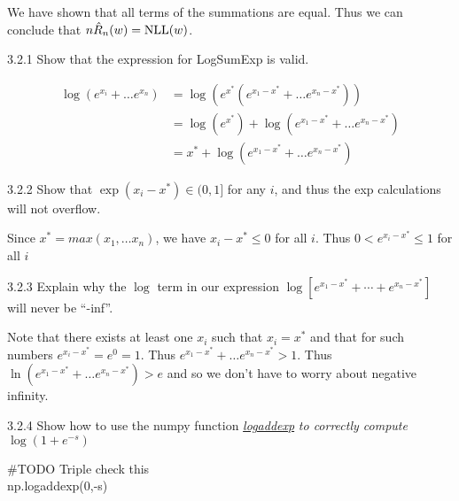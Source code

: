\documentclass[12pt,letterpaper]{article}
\begin{document}
\begin{solution}{}
    We have shown that all terms of the summations are equal. Thus we can conclude that $n\hat{R}_{n}(w)=\text{NLL}(w)$.
\end{solution}
\newpage

\begin{problem}{3.2.1}
    Show that the expression for LogSumExp is valid.
\end{problem}
\begin{solution}{}
    \begin{align*}
        \log(e^{x_i} + \dots e^{x_n}) &= \log(e^{x^*}(e^{x_1-x^*} + \dots e^{x_n-x^*}))\\
        &= \log(e^{x^*}) + \log(e^{x_1-x^*} + \dots e^{x_n-x^*})\\
        &= x^* + \log(e^{x_1-x^*} + \dots e^{x_n-x^*})
    \end{align*}
\end{solution}
\newpage

\begin{problem}{3.2.2}
    Show that $\exp\left(x_{i}-x^{*}\right)\in(0,1]$ for any $i$, and thus the exp calculations will not overflow.
\end{problem}
\begin{solution}{}
    Since $x^*=max(x_1, \dots x_n)$, we have $x_i-x^*\leq 0$ for all $i$. Thus $0<e^{x_i-x^*}\leq1$ for all $i$
\end{solution}
\newpage

\begin{problem}{3.2.3}
    Explain why the $\log$ term in our expression
    $\log\left[e^{x_{1}-x^{*}}+\cdots+e^{x_{n}-x^{*}}\right]$ will never
    be ``-inf''.
\end{problem}
\begin{solution}{}
    Note that there exists at least one $x_i$ such that $x_i=x^*$ and that for such numbers $e^{x_i-x^*}=e^0=1$. 
    Thus $e^{x_1-x^*} + \dots e^{x_n-x^*} > 1$. Thus $\ln(e^{x_1-x^*} + \dots e^{x_n-x^*}) > e$ and so we don't have to worry
    about negative infinity.
\end{solution}
\newpage

\begin{problem}{3.2.4}
    Show how to use the numpy function\textit{ \href{https://docs.scipy.org/doc/numpy/reference/generated/numpy.logaddexp.html}{logaddexp}
    }\textit{\emph{to correctly compute $\log\left(1+e^{-s}\right)$}}
\end{problem}
\begin{solution}{}
    #TODO Triple check this\\
    np.logaddexp(0,-s)
\end{solution}
\end{document}
